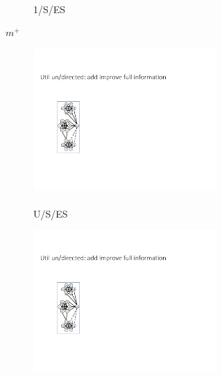 \begin{figure}[t]
\begin{subfigure}{0.6\textwidth}
\begin{subfigure}{0.15\textwidth}
        \caption{\\1/S/ES}
        \label{fig:Least1_size_undirected_add}
        \end{subfigure}
    \addtocounter{subfigure}{-1}
    \caption{$m^+$}
    \label{fig:add_es_subfig} 
    \end{subfigure}
    \hfill
    \begin{subfigure}{0.3\textwidth}
    \centering  
        \begin{subfigure}{0.3\textwidth}
            \renewcommand\thesubfigure{\alph{subfigure}1}
            \centering
        \includegraphics[page=45,width=\textwidth]{Graphs/graphs.pdf}
        \caption{\\U/S/ES}
        \label{fig:Util_size_remove}
        \end{subfigure}    
        \hfill
        \begin{subfigure}{0.3\textwidth}
        \addtocounter{subfigure}{-1}
        \renewcommand\thesubfigure{\alph{subfigure}2}
            \centering
        \includegraphics[page=21,width=\textwidth]{Graphs/graphs.pdf}

\end{subfigure}
\end{subfigure}
\end{figure}
